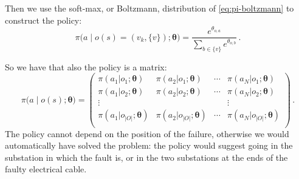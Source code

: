 Then we use the soft-max, or Boltzmann, distribution of \eqref{eq:pi-boltzmann} to construct the policy:
\begin{equation}
    \pi \Big( a \;\big|\; o(s) = (v_k, \{v\}); \boldsymbol \theta \Big) = \frac{e^{\theta_{o,a} }}{\sum_{b \in \{v\}} e^{\theta_{o,b} }} \,.
    \label{eq:parameterizedpolicy}
\end{equation}

So we have that also the policy is a matrix:
\begin{equation}
    \pi \Big( a \;\big|\; o(s); \boldsymbol \theta \Big) = \begin{pmatrix}
        \pi(a_1 | o_1; \boldsymbol \theta) & \pi(a_2 | o_1; \boldsymbol \theta) & \cdots & \pi(a_N | o_1; \boldsymbol \theta) \\
        \pi(a_1 | o_2; \boldsymbol \theta) & \pi(a_2 | o_2; \boldsymbol \theta) & \cdots & \pi(a_N | o_2; \boldsymbol \theta) \\
        \vdots            &                   &        & \vdots            \\
        \pi(a_1 | o_{|O|}; \boldsymbol \theta) & \pi(a_2 | o_{|O|}; \boldsymbol \theta)  & \cdots &  \pi(a_N | o_{|O|}; \boldsymbol \theta) \\
    \end{pmatrix} \, .
\end{equation}
The policy cannot depend on the position of the failure, otherwise we would automatically have solved the problem: the policy would suggest going in the substation in which the fault is, or in the two substations at the ends of the faulty electrical cable.

